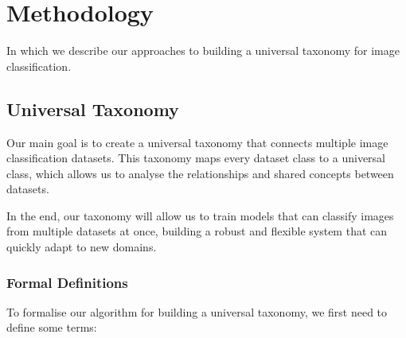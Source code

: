 \chapter{Methodology}

\begin{center}
    \begin{minipage}{0.5\textwidth}
        \begin{small}
            In which we describe our approaches to building a universal taxonomy
            for image classification.
        \end{small}
    \end{minipage}
    \vspace{0.5cm}
\end{center}

\section{Universal Taxonomy}

Our main goal is to create a universal taxonomy that connects multiple
image classification datasets.
This taxonomy maps every dataset class to a universal class,
which allows us to analyse the relationships and shared concepts between datasets.

In the end, our taxonomy will allow us to train models that can classify images
from multiple datasets at once, building a robust and flexible system
that can quickly adapt to new domains.

\subsection{Formal Definitions}

To formalise our algorithm for building a universal taxonomy,
we first need to define some terms:

